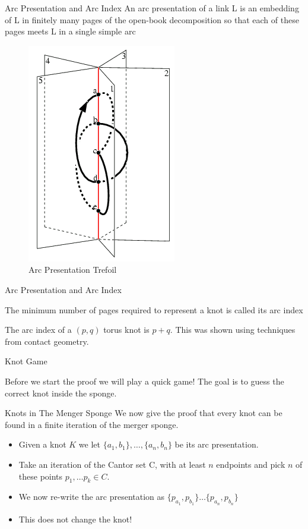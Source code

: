 \begin{frame}{Arc Presentation and Arc Index}
	An arc presentation of a link L is an embedding of L in finitely many pages of the open-book decomposition so that each of these pages meets L in a single simple arc
	\begin{figure}
		\centering
		\includegraphics[width=0.2\linewidth]{MichaelImages/arc_index_fig1.png}
		\caption{Arc Presentation Trefoil}
		\label{fig:enter-label}
	\end{figure}
\end{frame}

\begin{frame}{Arc Presentation and Arc Index}
	\vspace{20px}
	\begin{definition}
		The minimum number of pages required to represent a knot is called its arc index
	\end{definition}
	
	\begin{example}
		The arc index of a $(p,q)$ torus knot is $p+q$. This was shown using techniques from contact geometry.
	\end{example}
\end{frame}

\begin{frame}[c]{Knot Game}
	\begin{center}
		Before we start the proof we will play a quick game!
		The goal is to guess the correct knot inside the sponge.
	\end{center}
	
	
\end{frame}

\begin{frame}[c]{Knots in The Menger Sponge}
	We now give the proof that every knot can be found in a finite iteration of the merger sponge.
	\begin{itemize}
		\item Given a knot $K$ we let $\{a_1, b_1\}, \dots, \{a_n, b_n\}$ be its arc presentation.
		\item Take an iteration of the Cantor set C, with at least $n$ endpoints and pick $n$ of these points $p_1, \dots p_k \in C$.
		\item We now re-write the arc presentation as $\{p_{a_1}, p_{b_1}\} \dots \{p_{a_n}, p_{b_n}\}$
		\item This does not change the knot!
	\end{itemize}
\end{frame}

